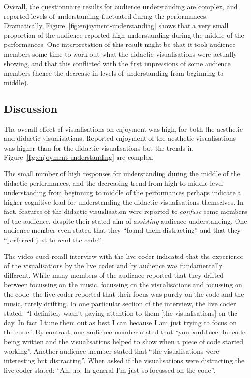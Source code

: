 \documentclass{sig-alternate}
\begin{document}
Overall, the questionnaire results for audience understanding are
complex, and reported levels of understanding fluctuated during the
performances. Dramatically, Figure~\ref{fig:enjoyment-understanding}
shows that a very small proportion of the audience reported high
understanding during the middle of the performances. One
interpretation of this result might be that it took audience members
some time to work out what the didactic visualisations were actually
showing, and that this conflicted with the first impressions of some
audience members (hence the decrease in levels of understanding from
beginning to middle).

\subsection{Discussion}

The overall effect of visualisations on enjoyment was high, for both
the aesthetic and didactic visualisations. Reported enjoyment of the
aesthetic visualisations was higher than for the didactic
visualisations but the trends in Figure~\ref{fig:enjoyment-understanding}
are complex.

The small number of high responses for understanding during the middle
of the didactic performances, and the decreasing trend from high to
middle level understanding from beginning to middle of the
performances perhaps indicate a higher cognitive load for
understanding the didactic visualisations themselves. In fact,
features of the didactic visualisation were reported to \emph{confuse}
some members of the audience, despite their stated aim of
\emph{assisting} audience understanding. One audience member even
stated that they ``found them distracting'' and that they ``preferred
just to read the code''.

The video-cued-recall interview with the live coder indicated that the
experience of the visualisations by the live coder and by audience was
fundamentally different. While many members of the audience reported
that they drifted between focussing on the music, focussing on the
visualisations and focussing on the code, the live coder reported that
their focus was purely on the code and the music, rarely drifting. In
one particular section of the interview, the live coder stated: ``I
definitely wasn't paying attention to them [the visualisations] on the
day. In fact I tune them out as best I can because I am just trying to
focus on the code''. By contrast, one audience member stated that
``you could see the code being written and the visualisations helped
to show when a piece of code started working''. Another audience
member stated that ``the visualisations were interesting but
distracting''. When asked if the visualisations were distracting the
live coder stated: ``Ah, no. In general I'm just so focussed on the
code''.
\end{document}
